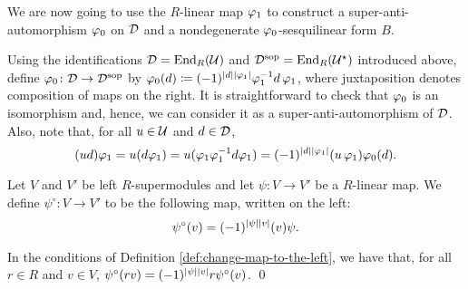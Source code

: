 \documentclass{amsbook}
\begin{document}



We are now going to use the $R$-linear map $\varphi_1$ to construct a super-anti-automorphism $\varphi_0$ on $\mathcal{D}$ and a nondegenerate $\varphi_0$-sesquilinear form $B$. 

Using the identifications $\mathcal{D} = \operatorname{End}_R(\mathcal U)$ and $\mathcal{D}^{\mathrm{sop}} = \operatorname{End}_R(\mathcal U^\star)$ introduced above, define $\varphi_0\colon \mathcal{D} \to \mathcal{D}^{\mathrm{sop}}$ by $\varphi_0(d) \coloneqq (-1)^{|d||\varphi_1|}\varphi_1^{-1} d \,\varphi_1$, where juxtaposition denotes composition of maps on the right. 
It is straightforward to check that $\varphi_0$ is an isomorphism and, hence, we can consider it as a super-anti-automorphism of $\mathcal{D}$. 
Also, note that, for all $u\in \mathcal U$ and $d\in \mathcal{D}$,
\begin{equation}\label{eq:sesquilinear-before-B}
    (ud)\varphi_1 = u (d\varphi_1) =  u(\varphi_1\varphi_1^{-1} d \varphi_1) = (-1)^{|d||\varphi_1|}(u\,\varphi_1 )\varphi_0(d).
\end{equation}


\begin{defi}\label{def:change-map-to-the-left}
    Let $V$ and $V'$ be left $R$-supermodules and let $\psi: V \to V'$ be a $R$-linear map. We define $\psi^\circ: V \to  V'$ to be the following map, written on the left:
    \[
        \psi^\circ(v) = (-1)^{|\psi||v|} (v)\psi.
    \]
\end{defi}

\begin{lemma}\label{lemma:change-of-side-properties}
    In the conditions of Definition \ref{def:change-map-to-the-left}, we have that, for all $r\in R$ and $v\in V$,  $\psi^\circ (rv) = (-1)^{|\psi||v|} r \psi^\circ (v)$. \qed
\end{lemma}
\end{document}
